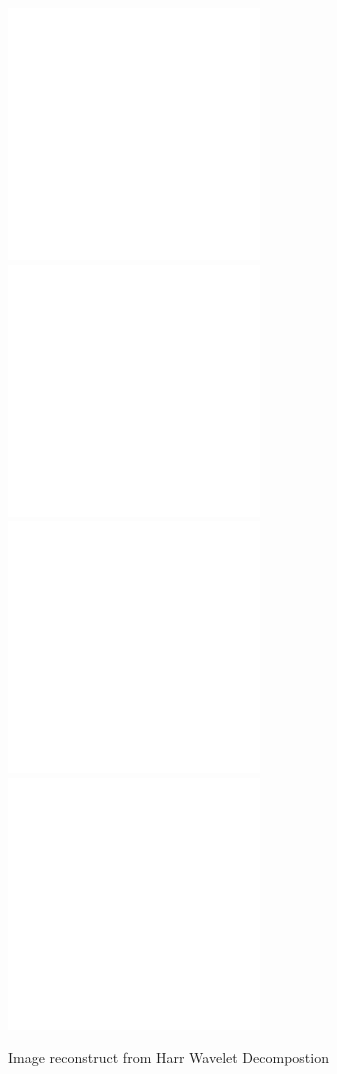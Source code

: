 \documentclass{article}
\begin{document}
\begin{figure}[h!]
  \centering
  	\includegraphics[height=18em]{code/outputs/prob6b.png}
	\includegraphics[height=18em]{code/outputs/prob6b_0.png}
	\includegraphics[height=18em]{code/outputs/prob6b_1.png}
	\includegraphics[height=18em]{code/outputs/prob6b_2.png}
  \caption{Image reconstruct from Harr Wavelet Decompostion}
\end{figure}
\end{document}
